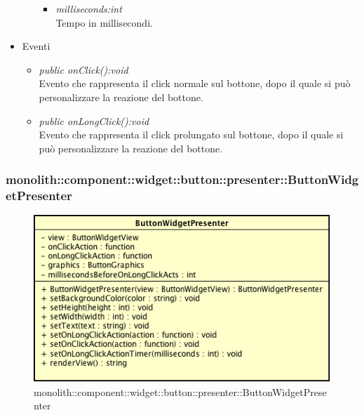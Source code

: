 \begin{itemize}
\begin{itemize}
\begin{itemize}
				\item \textit{milliseconds:int}\\
				Tempo in millisecondi.
	\end{itemize}
	\end{itemize}
\item{Eventi}
	\begin{itemize}
	\item \textit{public onClick():void}\\
	Evento che rappresenta il click normale sul bottone, dopo il quale si può personalizzare la reazione del bottone.
	\item \textit{public onLongClick():void}\\
	Evento che rappresenta il click prolungato sul bottone, dopo il quale si può personalizzare la reazione del bottone.
	\end{itemize}
\end{itemize}

\subsubsection{monolith::component::widget::button::presenter::ButtonWidgetPresenter}

\label{monolith::component::widget::button::presenter::ButtonWidgetPresenter}
\begin{figure}[H]
	\centering
	\includegraphics[scale=0.5]{Sezioni/SottosezioniST/img/ButtonWidgetPresenter.png}
	\caption{monolith::component::widget::button::presenter::ButtonWidgetPresenter}
\end{figure}

